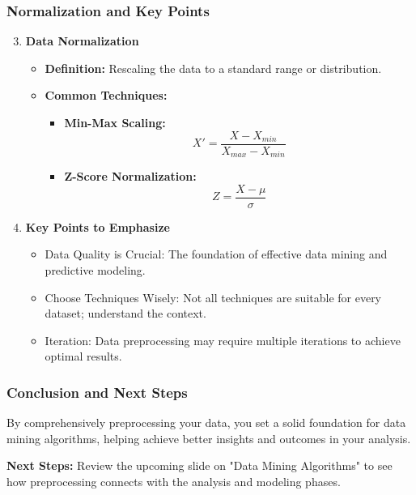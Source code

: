 \documentclass{beamer}
\begin{document}
\begin{frame}[fragile]
    \frametitle{Normalization and Key Points}
    \begin{enumerate}
        \setcounter{enumi}{2} %
        \item \textbf{Data Normalization}
        \begin{itemize}
            \item \textbf{Definition:} Rescaling the data to a standard range or distribution.
            \item \textbf{Common Techniques:}
            \begin{itemize}
                \item \textbf{Min-Max Scaling:}
                \begin{equation}
                    X' = \frac{X - X_{min}}{X_{max} - X_{min}}
                \end{equation}
                \item \textbf{Z-Score Normalization:}
                \begin{equation}
                    Z = \frac{X - \mu}{\sigma}
                \end{equation}
            \end{itemize}
        \end{itemize}
        
        \item \textbf{Key Points to Emphasize}
        \begin{itemize}
            \item Data Quality is Crucial: The foundation of effective data mining and predictive modeling.
            \item Choose Techniques Wisely: Not all techniques are suitable for every dataset; understand the context.
            \item Iteration: Data preprocessing may require multiple iterations to achieve optimal results.
        \end{itemize}
    \end{enumerate}
\end{frame}

\begin{frame}[fragile]
    \frametitle{Conclusion and Next Steps}
    By comprehensively preprocessing your data, you set a solid foundation for data mining algorithms, helping achieve better insights and outcomes in your analysis.

    \textbf{Next Steps:} Review the upcoming slide on "Data Mining Algorithms" to see how preprocessing connects with the analysis and modeling phases.
\end{frame}
\end{document}
